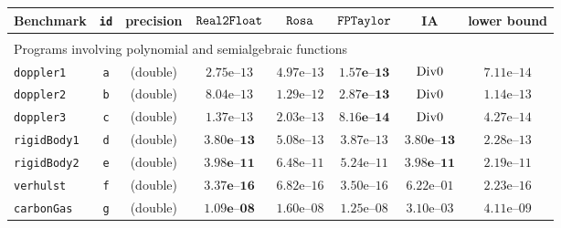 \begin{tabular}{p{2.3cm}ccccccc}
\hline
\multirow{1}{*}{Benchmark} &  \multirow{1}{*}{\texttt{id}} & \multirow{1}{*}{precision} & \multirow{1}{*}{$\mathtt{Real2Float}$} & $\mathtt{Rosa}$  & $\mathtt{FPTaylor}$  &\multirow{1}{*}{IA} & \multirow{1}{*}{lower bound} \\
\hline  
\\      
\multicolumn{8}{l}{Programs involving polynomial and semialgebraic functions}    \\
\hline
\multirow{1}{*}{\texttt{doppler1}} & \texttt{a}
& (double) & $2.75\text{e--}13$ & $4.97\text{e--}13$ & $\mathbf{1.57\textbf{e--}13}$ & $\text{Div0}$ & $7.11\text{e--}14$\\
\multirow{1}{*}{\texttt{doppler2}} & \texttt{b}
& (double) & $8.04\text{e--}13$ & $1.29\text{e--}12$ & $\mathbf{2.87\textbf{e--}13}$ & $\text{Div0}$ & $1.14\text{e--}13$\\
\multirow{1}{*}{\texttt{doppler3}} & \texttt{c}
& (double) & $1.37\text{e--}13$ & $2.03\text{e--}13$ & $\mathbf{8.16\textbf{e--}14}$ & $\text{Div0}$ & $4.27\text{e--}14$\\
\multirow{1}{*}{\texttt{rigidBody1}} & \texttt{d}
& (double) & $\mathbf{3.80\textbf{e--}13}$ & $5.08\text{e--}13$ & $3.87\text{e--}13$ & $\mathbf{3.80\textbf{e--}13}$ & $2.28\text{e--}13$\\
\multirow{1}{*}{\texttt{rigidBody2}} & \texttt{e}
& (double) & $\mathbf{3.98\textbf{e--}11}$ & $6.48\text{e--}11$ & $5.24\text{e--}11$ & $\mathbf{3.98\textbf{e--}11}$ & $2.19\text{e--}11$\\
\multirow{1}{*}{\texttt{verhulst}} & \texttt{f}
& (double) & $\mathbf{3.37\textbf{e--}16}$ & $6.82\text{e--}16$ & $3.50\text{e--}16$ & $6.22\text{e--}01$ & $2.23\text{e--}16$\\
\multirow{1}{*}{\texttt{carbonGas}} & \texttt{g}
& (double) & $\mathbf{1.09\textbf{e--}08}$ & $1.60\text{e--}08$ & $1.25\text{e--}08$ & $3.10\text{e--}03$ & $4.11\text{e--}09$ \\

\end{tabular}
